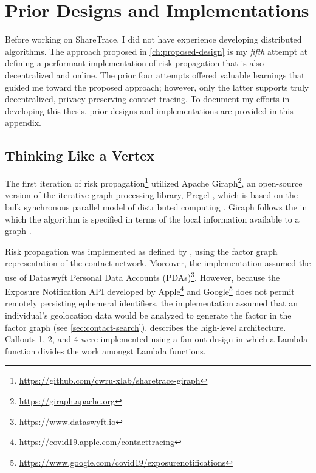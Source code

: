 \chapter{Prior Designs and Implementations}\label{ch:previous-designs}

Before working on ShareTrace, I did not have experience developing distributed algorithms. The approach proposed in \cref{ch:proposed-design} is my \emph{fifth} attempt at defining a performant implementation of risk propagation that is also decentralized and online. The prior four attempts offered valuable learnings that guided me toward the proposed approach; however, only the latter supports truly decentralized, privacy-preserving contact tracing. To document my efforts in developing this thesis, prior designs and implementations are provided in this appendix.

\section{Thinking Like a Vertex}\label{sec:giraph}

The first iteration of risk propagation\footnote{\url{https://github.com/cwru-xlab/sharetrace-giraph}} utilized Apache Giraph\footnote{\url{https://giraph.apache.org}}, an open-source version of the iterative graph-processing library, Pregel \citep{Malewicz2010}, which is based on the bulk synchronous parallel model of distributed computing \citep{Valiant1990}. Giraph follows the  in which the algorithm is specified in terms of the local information available to a graph \vertexName \citep{McCune2015}.

Risk propagation was implemented as defined by \citet{Ayday2020,Ayday2021}, using the factor graph representation of the contact network. Moreover, the implementation assumed the use of Dataswyft Personal Data Accounts (PDAs)\footnote{\url{https://www.dataswyft.io}}. However, because the Exposure Notification API developed by Apple\footnote{\url{https://covid19.apple.com/contacttracing}} and Google\footnote{\url{https://www.google.com/covid19/exposurenotifications}} does not permit remotely persisting ephemeral identifiers, the implementation assumed that an individual's geolocation data would be analyzed to generate the factor \verticesName in the factor graph (see \cref{sec:contact-search}).  describes the high-level architecture. Callouts 1, 2, and 4 were implemented using a fan-out design in which a  Lambda function divides the work amongst  Lambda functions.

